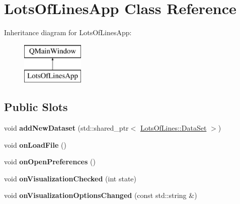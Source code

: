 \hypertarget{class_lots_of_lines_app}{}\section{Lots\+Of\+Lines\+App Class Reference}
\label{class_lots_of_lines_app}
Inheritance diagram for Lots\+Of\+Lines\+App\+:\begin{figure}[H]
\begin{center}
\leavevmode
\includegraphics[height=2.000000cm]{class_lots_of_lines_app}
\end{center}
\end{figure}
\subsection*{Public Slots}
\begin{DoxyCompactItemize}
\item 
void {\bfseries add\+New\+Dataset} (std\+::shared\+\_\+ptr$<$ \hyperlink{class_lots_of_lines_1_1_data_set}{Lots\+Of\+Lines\+::\+Data\+Set} $>$)\hypertarget{class_lots_of_lines_app_af33c81460bf4947644959afedfa1574b}{}\label{class_lots_of_lines_app_af33c81460bf4947644959afedfa1574b}

\item 
void {\bfseries on\+Load\+File} ()\hypertarget{class_lots_of_lines_app_a0701fd75172ff4a0cd92bd2faba9eb41}{}\label{class_lots_of_lines_app_a0701fd75172ff4a0cd92bd2faba9eb41}

\item 
void {\bfseries on\+Open\+Preferences} ()\hypertarget{class_lots_of_lines_app_aaa0caf1c43436c86db33a5ad9babd864}{}\label{class_lots_of_lines_app_aaa0caf1c43436c86db33a5ad9babd864}

\item 
void {\bfseries on\+Visualization\+Checked} (int state)\hypertarget{class_lots_of_lines_app_abe6641f9fdc77e64232686a54bde553a}{}\label{class_lots_of_lines_app_abe6641f9fdc77e64232686a54bde553a}

\item 
void {\bfseries on\+Visualization\+Options\+Changed} (const std\+::string \&)\hypertarget{class_lots_of_lines_app_a7ec3d5c0cc49b421841f2f06c939383a}{}\label{class_lots_of_lines_app_a7ec3d5c0cc49b421841f2f06c939383a}

\end{DoxyCompactItemize}
